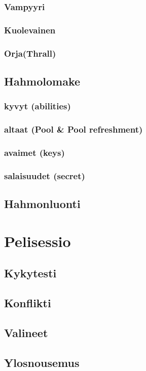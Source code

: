\documentclass[a4paper, 12pt, finnish]{article}
\begin{document}
{		\subsubsection{Vampyyri}
		\subsubsection{Kuolevainen}
		\subsubsection{Orja(Thrall)}
	\subsection{Hahmolomake}
		\subsubsection{kyvyt (abilities)}
		\subsubsection{altaat (Pool \& Pool refreshment)}
		\subsubsection{avaimet (keys)}
		\subsubsection{salaisuudet (secret)}
	\subsection{Hahmonluonti}
\section{Pelisessio}
	\subsection{Kykytesti}
	\subsection{Konflikti}
	\subsection{Valineet}
	\subsection{Ylosnousemus}
}
\end{document}
